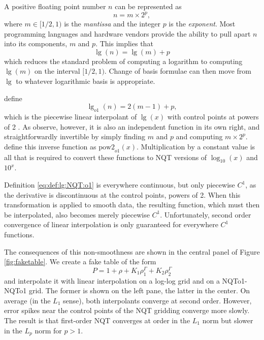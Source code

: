 \documentclass[linenumbers,twocolumn]{aastex631}
\begin{document}
A positive floating point number $n$ can be
represented as
\begin{equation}
    \label{eq:float:representation}
    n = m \times 2^{p},
\end{equation}
where $m\in [1/2, 1)$ is the \textit{mantissa} and the integer $p$ is
the \textit{exponent}. Most programming languages and hardware vendors
provide the ability to pull apart $n$ into its components, $m$ and
$p$.  This implies that
\begin{equation}
  \label{eq:approx:log}
  \lg(n) = \lg(m) + p
\end{equation}
which reduces the standard problem of computing a logarithm to
computing $\lg(m)$ on the interval $[1/2, 1)$. Change of basis
formulae can then move from $\lg$ to whatever logarithmic basis is
appropriate.

\citet{NQTo1} define  
\begin{equation}
  \label{eq:def:lg:NQT:o1}
  \lg_{o1}(n) = 2 (m - 1) + p,
\end{equation}
which is the piecewise linear interpolant of $\lg(x)$ with control points at powers of 2 \citep{Hall}.  As \citet{NQTo1} observe, however, it is also an independent function in its own right, and straightforwardly invertible by simply finding $m$ and $p$ and computing $m \times
2^p$. \citet{NQTo1} define this inverse function as $\text{pow2}_{o1}(x)$. Multiplication by a constant value is all that is required to convert these functions to NQT versions of $\log_{10}(x)$ and $10^x$.

Definition \eqref{eq:def:lg:NQT:o1} is everywhere continuous, but only piecewise $C^1$, as the derivative is discontinuous at the control points, powers of 2. When this transformation is applied to smooth data, the resulting function, which must then be interpolated, also becomes merely piecewise $C^1$. Unfortunately, second order convergence of linear interpolation is only guaranteed for everywhere $C^1$ functions.

The consequences of this non-smoothness are shown in the central panel of Figure \ref{fig:faketable}. We create a fake table of the form
$$P = 1 + \rho + K_1 \rho^\Gamma_1 + K_2 \rho^\Gamma_2$$
and interpolate it with linear interpolation on a log-log grid and on a NQTo1-NQTo1 grid. The former is shown on the left pane, the latter in the center. On average (in the $L_1$ sense), both interpolants converge at second order. However, error spikes near the control points of the NQT gridding converge more slowly. The result is that first-order NQT converges at order in the $L_1$ norm but slower in the $L_p$ norm for $p>1$.
\end{document}

